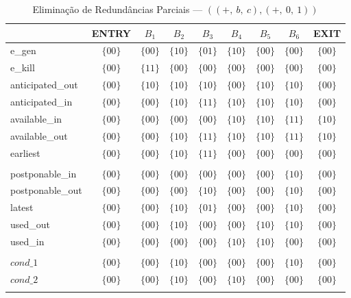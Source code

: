 \begin{table}[ht]
\centering
\begin{tabular}{l|c|c|c|c|c|c|c|c}
	& ENTRY & $B_{1}$ & $B_{2}$ & $B_{3}$ & $B_{4}$ & $B_{5}$ & $B_{6}$ & EXIT \\
\hline
e\_gen & $\{00\}$ & $\{00\}$ & $\{10\}$ & $\{01\}$ & $\{10\}$ & $\{00\}$ & $\{00\}$ & $\{00\}$ \\
e\_kill & $\{00\}$ & $\{11\}$ & $\{00\}$ & $\{00\}$ & $\{00\}$ & $\{00\}$ & $\{00\}$ & $\{00\}$ \\
anticipated\_out & $\{00\}$ & $\{10\}$ & $\{10\}$ & $\{10\}$ & $\{00\}$ & $\{10\}$ & $\{10\}$ & $\{00\}$ \\
anticipated\_in & $\{00\}$ & $\{00\}$ & $\{10\}$ & $\{11\}$ & $\{10\}$ & $\{10\}$ & $\{10\}$ & $\{00\}$ \\
available\_in & $\{00\}$ & $\{00\}$ & $\{00\}$ & $\{00\}$ & $\{10\}$ & $\{10\}$ & $\{11\}$ & $\{10\}$ \\
available\_out & $\{00\}$ & $\{00\}$ & $\{10\}$ & $\{11\}$ & $\{10\}$ & $\{10\}$ & $\{11\}$ & $\{10\}$ \\
earliest & $\{00\}$ & $\{00\}$ & $\{10\}$ & $\{11\}$ & $\{00\}$ & $\{00\}$ & $\{00\}$ & $\{00\}$ \\
 &  &  &  &  &  &  &  &  \\
postponable\_in & $\{00\}$ & $\{00\}$ & $\{00\}$ & $\{00\}$ & $\{00\}$ & $\{00\}$ & $\{10\}$ & $\{00\}$ \\
postponable\_out & $\{00\}$ & $\{00\}$ & $\{00\}$ & $\{10\}$ & $\{00\}$ & $\{00\}$ & $\{10\}$ & $\{00\}$ \\
latest & $\{00\}$ & $\{00\}$ & $\{10\}$ & $\{01\}$ & $\{00\}$ & $\{00\}$ & $\{10\}$ & $\{00\}$ \\
used\_out & $\{00\}$ & $\{00\}$ & $\{10\}$ & $\{00\}$ & $\{00\}$ & $\{10\}$ & $\{10\}$ & $\{00\}$ \\
used\_in & $\{00\}$ & $\{00\}$ & $\{00\}$ & $\{00\}$ & $\{10\}$ & $\{10\}$ & $\{00\}$ & $\{00\}$ \\
 &  &  &  &  &  &  &  &  \\
$cond\_1$ & $\{00\}$ & $\{00\}$ & $\{10\}$ & $\{00\}$ & $\{00\}$ & $\{00\}$ & $\{10\}$ & $\{00\}$ \\
$cond\_2$ & $\{00\}$ & $\{00\}$ & $\{10\}$ & $\{00\}$ & $\{10\}$ & $\{00\}$ & $\{00\}$ & $\{00\}$ \\
\\
\end{tabular}
\caption{Elimina\c{c}\~ao de Redund\^ancias Parciais --- $((+,\:b,\:c), (+,\:0,\:1))$}
\end{table}



